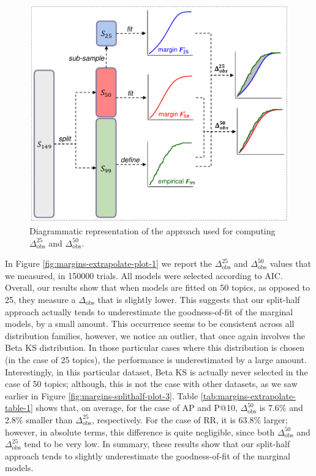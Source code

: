 \begin{figure}[t]
	\centering	
	\includegraphics[width=0.75\linewidth]{../diagrams/diag5}
	\caption{Diagrammatic representation of the approach used for computing $\Delta_\text{obs}^{25}$ and $\Delta_\text{obs}^{50}$.}
	\label{fig:diag5}
\end{figure}

In Figure \ref{fig:margins-extrapolate-plot-1} we report the $\Delta_\text{obs}^{25}$ and $\Delta_\text{obs}^{50}$ values that we measured, in \num{150000} trials. All models were selected according to AIC. Overall, our results show that when models are fitted on 50 topics, as opposed to 25, they measure a $\Delta_\text{obs}$ that is slightly lower. This suggests that our split-half approach actually tends to underestimate the goodness-of-fit of the marginal models, by a small amount. This occurrence seems to be consistent across all distribution families, however, we notice an outlier, that once again involves the Beta KS distribution. In those particular cases where this distribution is chosen (in the case of 25 topics), the performance is underestimated by a large amount. Interestingly, in this particular dataset, Beta KS is actually never selected in the case of 50 topics; although, this is not the case with other datasets, as we saw earlier in Figure \ref{fig:margins-splithalf-plot-3}. Table \ref{tab:margins-extrapolate-table-1} shows that, on average, for the case of AP and P@10, $\Delta_\text{obs}^{50}$ is 7.6\% and 2.8\% smaller than $\Delta_\text{obs}^{25}$, respectively. For the case of RR, it is 63.8\% larger; however, in absolute terms, this difference is quite negligible, since both $\Delta_\text{obs}^{50}$ and $\Delta_\text{obs}^{25}$ tend to be very low. In summary, these results show that our split-half approach tends to slightly underestimate the goodness-of-fit of the marginal models. 

